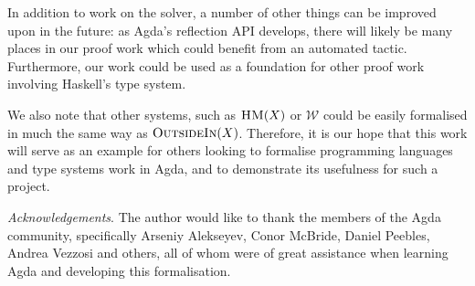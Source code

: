 \documentclass[a4paper]{jfp}
\newcommand{\outsidein}{\textsc{OutsideIn}(X)}
\begin{document}
In addition to work on the solver, a number of other things can be improved upon in the future: as Agda's reflection API develops, there will likely be many places in our proof work which could benefit from an automated tactic. Furthermore, our work could be used as a foundation for other proof work involving Haskell's type system. 

We also note that other systems, such as $\textsc{HM}(X)$ or $\mathcal{W}$ could be easily formalised in much the same way as $\outsidein$. Therefore, it is our hope that this work will serve as an example for others looking to formalise programming languages and type systems work in Agda, and to demonstrate its usefulness for such a project.

\bigskip

\emph{Acknowledgements}. The author would like to thank the members of the Agda community, specifically Arseniy Alekseyev, Conor McBride, Daniel Peebles, Andrea Vezzosi and others, all of whom were of great assistance when learning Agda and developing this formalisation.

\bigskip

	
\end{document}
